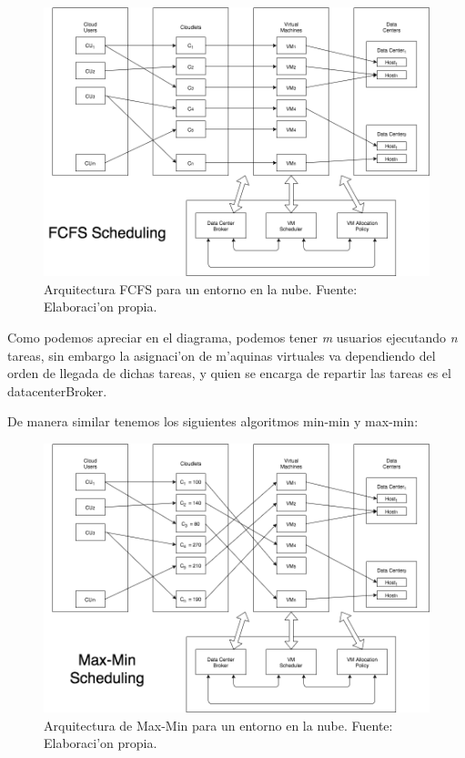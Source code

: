 \begin{figure}
	\caption{Arquitectura FCFS para un entorno en la nube. Fuente: Elaboraci'on propia.}
	\centering
	\includegraphics[scale=0.5]{media/imagentres}
\end{figure}



Como podemos apreciar en el diagrama, podemos tener \emph{m} usuarios ejecutando \emph{n} tareas, sin embargo la asignaci'on de m'aquinas virtuales va dependiendo del orden de llegada de dichas tareas, y quien se encarga de repartir las tareas es el datacenterBroker.

De manera similar tenemos los siguientes algoritmos min-min y max-min:



\begin{figure}
	\caption{Arquitectura de Max-Min para un entorno en la nube. Fuente: Elaboraci'on propia.}
	\centering
	\includegraphics[scale=0.5]{media/imagencuatro}
\end{figure}


